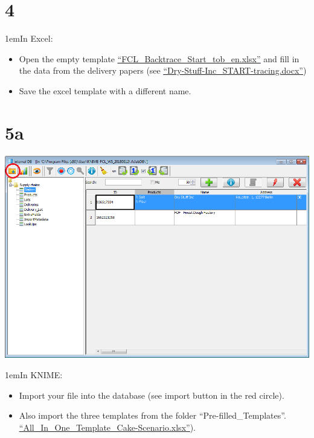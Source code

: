 \documentclass[10pt]{beamer}
\begin{document}
\section{4}
\begin{frame}
\leftskip1em{In Excel:}
	\begin{itemize}
		\item Open the empty template \textcolor{blue}{\underline{\href{https://foodrisklabs.bfr.bund.de/wp-content/uploads/2015/11/FCL\_Backtrace\_Start\_tob\_en.xlsx}{``FCL\_Backtrace\_Start\_tob\_en.xlsx''}}} and fill in the data from the delivery papers (see \textcolor{blue}{\underline{\href{https://github.com/SiLeBAT/BfROpenLabResources/raw/master/GitHubPages/documents/FCL\_Data\_collection\_and\_import/Dry-Stuff-Inc_START-tracing.docx}{``Dry-Stuff-Inc\_START-tracing.docx''}}})
		\item Save the excel template with a different name.
	\end{itemize}
\end{frame}

\section{5a}
\begin{frame}
	\begin{center}
			\includegraphics[height=0.6\textheight]{5a.png}
	\end{center}
\leftskip1em{In KNIME:}
	\begin{itemize}
		\item Import your file into the database (see import button in the red circle).
		\item Also import the three templates from the folder ``Pre-filled\_Templates''. \textcolor{blue}{\underline{\href{https://github.com/SiLeBAT/BfROpenLabResources/raw/master/GitHubPages/documents/FCL\_Data\_collection\_and\_import/All\_In\_One\_Template\_Cake-Scenario.xlsx}{``All\_In\_One\_Template\_Cake-Scenario.xlsx''}}}).
	\end{itemize}
\end{frame}
\end{document}
